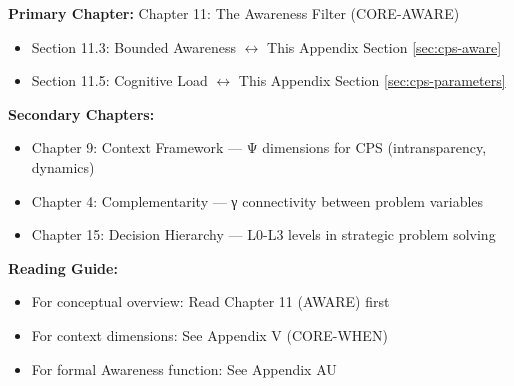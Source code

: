 \begin{tcolorbox}[colback=purple!5!white, colframe=purple!75!black,
    title=Chapter Linkage]

\textbf{Primary Chapter:} Chapter 11: The Awareness Filter (CORE-AWARE)
\begin{itemize}[nosep]
\item Section 11.3: Bounded Awareness $\leftrightarrow$ This Appendix Section \ref{sec:cps-aware}
\item Section 11.5: Cognitive Load $\leftrightarrow$ This Appendix Section \ref{sec:cps-parameters}
\end{itemize}

\textbf{Secondary Chapters:}
\begin{itemize}[nosep]
\item Chapter 9: Context Framework --- Ψ dimensions for CPS (intransparency, dynamics)
\item Chapter 4: Complementarity --- γ connectivity between problem variables
\item Chapter 15: Decision Hierarchy --- L0-L3 levels in strategic problem solving
\end{itemize}

\textbf{Reading Guide:}
\begin{itemize}[nosep]
\item For conceptual overview: Read Chapter 11 (AWARE) first
\item For context dimensions: See Appendix V (CORE-WHEN)
\item For formal Awareness function: See Appendix AU
\end{itemize}

\end{tcolorbox}


\begin{abstract}
Complex Problem Solving (CPS) is a well-established research paradigm originating from Dörner's work on the ``Logic of Failure'' and operationalized through Funke's MicroDYN approach. This appendix demonstrates that CPS is not a separate theory in the EBF but rather a specific \textbf{configuration of 6 existing CORE dimensions}: AWARE, HOW, WHEN, READY, STAGE, and WHAT. We provide the core formula $U_{\text{CPS}}(t) = A(\Psi_{\text{load}}) \times (1-\eta) \times [U_D + \sum \gamma_{ij} \times (\frac{dX_i}{dt} \times \frac{dX_j}{dt})]$, validate parameters from the CPS literature, and derive intervention priorities based on sensitivity analysis showing intransparency (η) as the primary lever (42\%).
\end{abstract}

